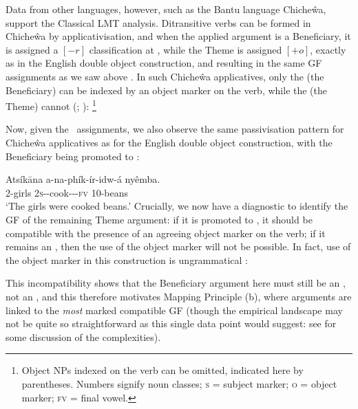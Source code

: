 \documentclass[output=paper]{langscibook}
\begin{document}
Data from other languages, however, such as the Bantu language Chiche\^{w}a,
support the Classical LMT analysis. Ditransitive verbs can be formed in
Chiche\^{w}a by applicativisation, and when the applied argument is a
Beneficiary, it is assigned a $[-r]$ classification at \astruc, while the Theme
is assigned $[+o]$, exactly as in the English double object construction, and
resulting in the same GF assignments as we saw above
\citep[28]{AlsinaMchombo:Appl}. In such Chiche\^wa applicatives, only the \OBJ
(the Beneficiary) can be indexed by an object marker on the verb, while the
\OBJTHETA (the Theme) cannot (\citealp{BresMosh90};
\citealp[22]{AlsinaMchombo:Appl}):%
%
\footnote{Object NPs indexed on the verb can be omitted, indicated here by
  parentheses. Numbers signify noun classes; \textsc{s} = subject marker;
  \textsc{o} = object marker; \textsc{fv} = final vowel.}
%

\ea
{}
\z
\z
%
Now, given the \astruc\ assignments, we also observe the same passivisation
pattern for Chiche\^wa applicatives as for the English double object
construction, with the Beneficiary \OBJ being promoted to \SUBJ
\citep[29]{AlsinaMchombo:Appl}:

\ea
\gll Ats\'ik\=ana  a-na-ph\'ik-\'ir-idw-\'a ny\^emba.\\
2-girls 2\textsc{s}-\PST-cook-\APPL-\PASS-\textsc{fv} 10-beans\\
\glt `The girls were cooked beans.'
\z
%
Crucially, we now have a diagnostic to identify the GF of the remaining Theme
argument: if it is promoted to \OBJ, it should be compatible with the presence
of an agreeing object marker on the verb; if it remains an \OBJTHETA, then the
use of the object marker will not be possible. In fact, use of the object marker
in this construction is ungrammatical \citep[30]{AlsinaMchombo:Appl}:

\z
%
This incompatibility shows that the Beneficiary argument here must still be an
\OBJTHETA, not an \OBJ, and this therefore motivates Mapping Principle (b),
where arguments are linked to the \emph{most} marked compatible GF (though the
empirical landscape may not be quite so straightforward as this single data
point would suggest: see \citealt{Kibort:08} for some discussion of the
complexities).
\end{document}
